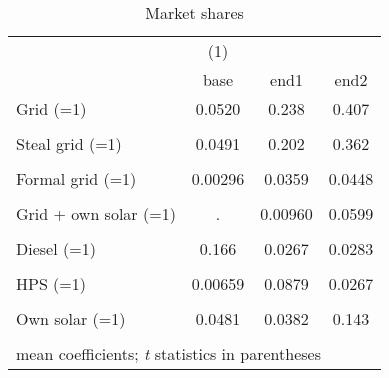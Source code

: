 \begin{table}[htbp]\centering
\caption{Market shares}
\begin{tabular}{l*{3}{c}}
\toprule
                &\multicolumn{1}{c}{(1)}&         &         \\
                &     base&     end1&     end2\\
\midrule
Grid (=1)       &   0.0520&    0.238&    0.407\\
                &         &         &         \\
\addlinespace
Steal grid (=1) &   0.0491&    0.202&    0.362\\
                &         &         &         \\
\addlinespace
Formal grid (=1)&  0.00296&   0.0359&   0.0448\\
                &         &         &         \\
\addlinespace
Grid + own solar (=1)&        .&  0.00960&   0.0599\\
                &         &         &         \\
\addlinespace
Diesel (=1)     &    0.166&   0.0267&   0.0283\\
                &         &         &         \\
\addlinespace
HPS (=1)        &  0.00659&   0.0879&   0.0267\\
                &         &         &         \\
\addlinespace
Own solar (=1)  &   0.0481&   0.0382&    0.143\\
                &         &         &         \\
\bottomrule
\multicolumn{4}{l}{\footnotesize mean coefficients; \textit{t} statistics in parentheses}\\
\end{tabular}
\end{table}
